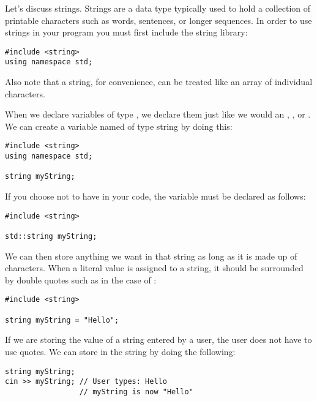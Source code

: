 
Let's discuss strings.
Strings are a data type typically used to hold a collection of printable characters such as words, sentences, or longer sequences.
In order to use strings in your program you must first include the string library:
\begin{lstlisting}
#include <string>
using namespace std;
\end{lstlisting}

\noindent Also note that a string, for convenience, can be treated like an array of individual characters.

When we declare variables of type , we declare them just like we would an , , or .
We can create a variable named  of type string by doing this:

\begin{lstlisting}
#include <string>
using namespace std;

string myString;
\end{lstlisting}

\noindent If you choose not to have  in your code, the variable  must be declared as follows:

\noindent\begin{minipage}{\linewidth}\begin{lstlisting}
#include <string>

std::string myString;
\end{lstlisting}\end{minipage}

\noindent We can then store anything we want in that string as long as it is made up of characters.
When a literal value is assigned to a string, it should be surrounded by double quotes such as in the case of :

\noindent\begin{minipage}{\linewidth}\begin{lstlisting}
#include <string>

string myString = "Hello";
\end{lstlisting}\end{minipage}

If we are storing the value of a string entered by a user, the user does not have to use quotes.
We can store  in the string by doing the following:

\noindent\begin{minipage}{\linewidth}\begin{lstlisting}
string myString;
cin >> myString; // User types: Hello
                 // myString is now "Hello"
\end{lstlisting}\end{minipage}

